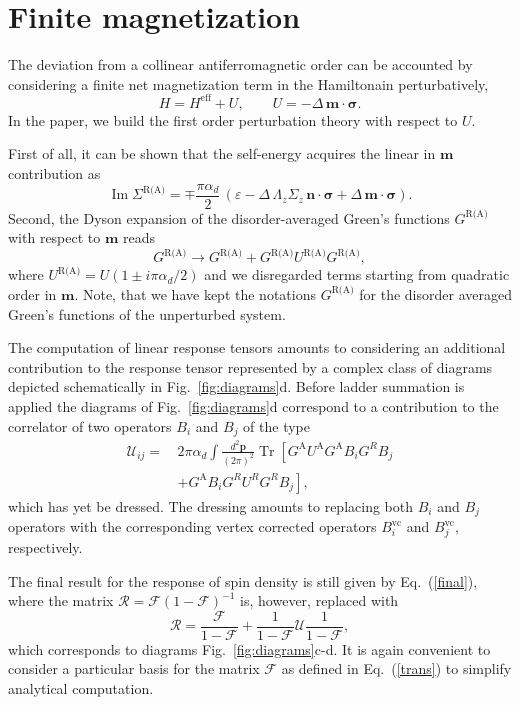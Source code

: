 \documentclass[%
  twocolumn,
  aps,
  prb,
  amsmath,
  amssymb,
  superscriptaddress,
  nofootinbib,
  floatfix
]{revtex4-1}
\newcommand{\be}{\begin{equation}}
\newcommand{\e}{\end{equation}}
\newcommand{\lt}{\left}
\newcommand{\rt}{\right}
\newcommand{\n}{\nonumber}
\newcommand{\ep}{\varepsilon}
\newcommand{\bb}{\boldsymbol}
\newcommand{\0}{^{\phantom{\dagger}}}
\DeclareMathOperator{\tr}{Tr}
\DeclareMathOperator{\im}{Im}
\begin{document}
\section{Finite magnetization}\label{sec:appd}
The deviation from a collinear antiferromagnetic order can be accounted by considering a finite net magnetization term in the Hamiltonain perturbatively,
\be
H =H^\textrm{eff}+ U, \qquad U = -\Delta\,\bb{m}\cdot\bb{\sigma}.
\e
In the paper, we build the first order perturbation theory with respect to $U$. 

First of all, it can be shown that the self-energy acquires the linear in $\bb{m}$ contribution as
\be\label{eq:SEcorr}
\im \Sigma^\text{R(A)} = \mp\frac{\pi\alpha_d}{2}\,(\ep-\Delta\,\Lambda_z\Sigma_z\,\bb{n}\cdot\bb{\sigma}+\Delta\,\bb{m}\cdot\bb{\sigma}).
\e
Second, the Dyson expansion of the disorder-averaged Green's functions $G^\text{R(A)}$ with respect to $\bb{m}$ reads
\be
G^\text{R(A)}\rightarrow G^\text{R(A)}+G^\text{R(A)}U^\text{R(A)}G^\text{R(A)},
\e
where $U^\text{R(A)}=U(1 \pm i \pi\alpha_d/2)$ and we disregarded terms starting from quadratic order in $\bb{m}$. Note, that 
we have kept the notations $G^\text{R(A)}$ for the disorder averaged Green's functions of the unperturbed system. 

The computation of linear response tensors amounts to considering an additional contribution to the response tensor represented by a complex class of diagrams depicted schematically in  Fig.~\ref{fig:diagrams}d. Before ladder summation is applied the diagrams of Fig.~\ref{fig:diagrams}d correspond to a contribution to the correlator of two operators $B_i$ and $B_j$ of the type 
\begin{align}
\mathcal{U}_{ij} =\,& 2\pi\alpha_d \int \frac{d^2\bb{p}}{(2\pi)^2} \tr\lt[G^\text{A} U^\text{A} G^\text{A} B_i G^R B_j\n\rt.\\
&\lt.+G^\text{A} B_i G^R U^R G^R B_j\rt],   
\end{align}
which has yet be dressed. The dressing amounts to replacing both $B_i$ and $B_j$ operators with the corresponding vertex corrected operators $B^\textrm{vc}_i$ and $B^\textrm{vc}_j$, respectively. 

The final result for the response of spin density is still given by Eq.~(\ref{final}), where the matrix $\mathcal{R}=\mathcal{F}(1-\mathcal{F})^{-1}$ is, however, replaced with 
\be
\label{eq:mresp}
\mathcal{R}=\frac{\mathcal{F}}{1-\mathcal{F}} + \frac{1}{1-\mathcal{F}}\mathcal{U}\frac{1}{1-\mathcal{F}},
\e
which corresponds to diagrams Fig.~\ref{fig:diagrams}c-d.
It is again convenient to consider a particular basis for the matrix $\mathcal{F}$ as defined in Eq.~(\ref{trans}) to simplify analytical computation.  
\end{document}
